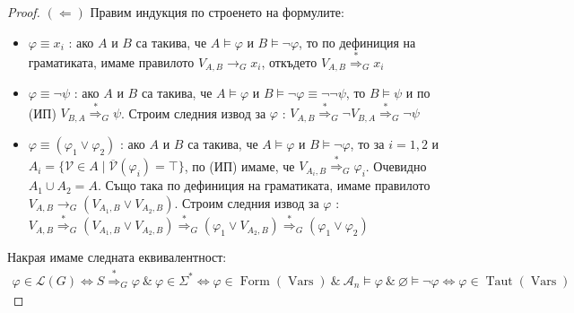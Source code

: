 \documentclass[a4paper]{article}
\newcommand{\vars}{\operatorname{Vars}}
\newcommand{\form}{\operatorname{Form}(\vars)}
\newcommand{\taut}{\operatorname{Taut}(\vars)}
\newcommand{\A}{\mathcal{A}}
\newcommand{\V}{\mathcal{V}}
\newcommand{\OV}{\overline{\V}}
\newcommand{\der}[2]{\stackrel{#1}{\Rightarrow}_{#2}}
\begin{document}
\begin{proof}
    $(\Leftarrow)$ Правим индукция по строенето на формулите:

    \begin{itemize}
        \item $\varphi \equiv x_i$ : ако $A$ и $B$ са такива, че $A \models \varphi$ и $B \models \neg \varphi$, то по дефиниция на граматиката, имаме правилото $V_{A, B} \rightarrow_G x_i$, откъдето $V_{A, B} \der{*}{G} x_i$
        \item $\varphi \equiv \neg \psi$ : ако $A$ и $B$ са такива, че $A \models \varphi$ и $B \models \neg \varphi \equiv \neg \neg \psi$, то $B \models \psi$ и по (ИП) $V_{B, A} \der{*}{G} \psi$.
              Строим следния извод за $\varphi$ : $V_{A, B} \der{*}{G} \neg V_{B, A} \der{*}{G} \neg \psi$
        \item $\varphi \equiv (\varphi_1 \lor \varphi_2)$ : ако $A$ и $B$ са такива, че $A \models \varphi$ и $B \models \neg \varphi$, то за $i = 1, 2$ и $A_i = \{ \V \in A \mid \OV(\varphi_i) = \top \}$, по (ИП) имаме, че $V_{A_i, B} \der{*}{G} \varphi_i$.
              Очевидно $A_1 \cup A_2 = A$.
              Също така по дефиниция на граматиката, имаме правилото $V_{A, B} \rightarrow_G (V_{A_1, B} \lor V_{A_2, B})$.
              Строим следния извод за $\varphi$ : $V_{A, B} \der{*}{G} (V_{A_1, B} \lor V_{A_2, B}) \der{*}{G} (\varphi_1 \lor V_{A_2, B}) \der{*}{G} (\varphi_1 \lor \varphi_2)$
    \end{itemize}

    Накрая имаме следната еквивалентност:
    \begin{align*}
        \varphi \in \mathcal{L}(G) \iff S \der{*}{G} \varphi \: \& \: \varphi \in \Sigma^* \iff \varphi \in \form \: \& \: \A_n \models \varphi \: \& \: \varnothing \models \neg \varphi \iff \varphi \in \taut
    \end{align*}
\end{proof}
\end{document}
